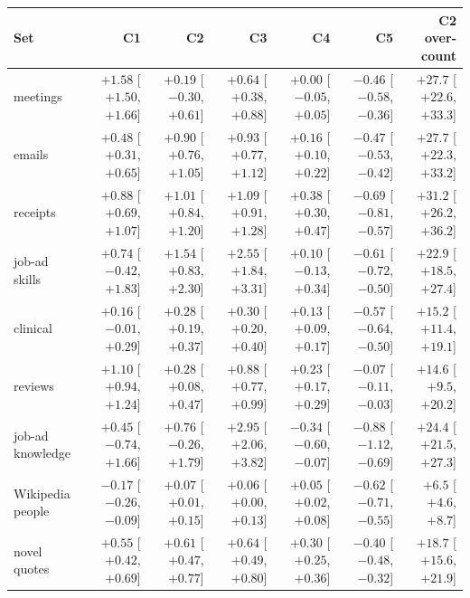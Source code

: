 \begin{tabular}{lrrrrrr}
  \toprule
  Set & C1 & C2 & C3 & C4 & C5 & C2 over-count \\
  \midrule
  meetings & $+1.58$ [$+1.50$, $+1.66$] & $+0.19$ [$-0.30$, $+0.61$] & $+0.64$ [$+0.38$, $+0.88$] & $+0.00$ [$-0.05$, $+0.05$] & $-0.46$ [$-0.58$, $-0.36$] & $+27.7$ [$+22.6$, $+33.3$] \\
  emails & $+0.48$ [$+0.31$, $+0.65$] & $+0.90$ [$+0.76$, $+1.05$] & $+0.93$ [$+0.77$, $+1.12$] & $+0.16$ [$+0.10$, $+0.22$] & $-0.47$ [$-0.53$, $-0.42$] & $+27.7$ [$+22.3$, $+33.2$] \\
  receipts & $+0.88$ [$+0.69$, $+1.07$] & $+1.01$ [$+0.84$, $+1.20$] & $+1.09$ [$+0.91$, $+1.28$] & $+0.38$ [$+0.30$, $+0.47$] & $-0.69$ [$-0.81$, $-0.57$] & $+31.2$ [$+26.2$, $+36.2$] \\
  job-ad skills & $+0.74$ [$-0.42$, $+1.83$] & $+1.54$ [$+0.83$, $+2.30$] & $+2.55$ [$+1.84$, $+3.31$] & $+0.10$ [$-0.13$, $+0.34$] & $-0.61$ [$-0.72$, $-0.50$] & $+22.9$ [$+18.5$, $+27.4$] \\
  clinical & $+0.16$ [$-0.01$, $+0.29$] & $+0.28$ [$+0.19$, $+0.37$] & $+0.30$ [$+0.20$, $+0.40$] & $+0.13$ [$+0.09$, $+0.17$] & $-0.57$ [$-0.64$, $-0.50$] & $+15.2$ [$+11.4$, $+19.1$] \\
  reviews & $+1.10$ [$+0.94$, $+1.24$] & $+0.28$ [$+0.08$, $+0.47$] & $+0.88$ [$+0.77$, $+0.99$] & $+0.23$ [$+0.17$, $+0.29$] & $-0.07$ [$-0.11$, $-0.03$] & $+14.6$ [$+9.5$, $+20.2$] \\
  job-ad knowledge & $+0.45$ [$-0.74$, $+1.66$] & $+0.76$ [$-0.26$, $+1.79$] & $+2.95$ [$+2.06$, $+3.82$] & $-0.34$ [$-0.60$, $-0.07$] & $-0.88$ [$-1.12$, $-0.69$] & $+24.4$ [$+21.5$, $+27.3$] \\
  Wikipedia people & $-0.17$ [$-0.26$, $-0.09$] & $+0.07$ [$+0.01$, $+0.15$] & $+0.06$ [$+0.00$, $+0.13$] & $+0.05$ [$+0.02$, $+0.08$] & $-0.62$ [$-0.71$, $-0.55$] & $+6.5$ [$+4.6$, $+8.7$] \\
  novel quotes & $+0.55$ [$+0.42$, $+0.69$] & $+0.61$ [$+0.47$, $+0.77$] & $+0.64$ [$+0.49$, $+0.80$] & $+0.30$ [$+0.25$, $+0.36$] & $-0.40$ [$-0.48$, $-0.32$] & $+18.7$ [$+15.6$, $+21.9$] \\
  \bottomrule
\end{tabular}

